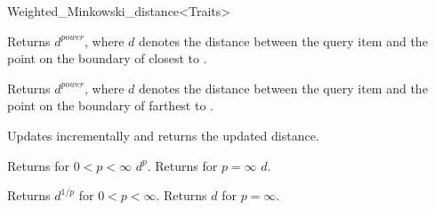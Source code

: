\begin{ccRefClass}{Weighted_Minkowski_distance<Traits>}
\ccOperations



{Returns $d^{power}$, where $d$ denotes the distance between the query item  and
the point on the boundary of  closest to .}

{Returns $d^{power}$, where $d$ denotes the distance between the query item  and
the point on the boundary of  farthest to .}

 {Updates  incrementally
and returns the updated distance.}

 {Returns for $0 < p <\infty$ $d^p$. Returns for $p=\infty$ $d$.}

 {Returns $d^{1/p}$ for $0 < p <\infty$.
Returns $d$ for $p=\infty$.}
 

\ccSeeAlso

\\

\end{ccRefClass}



